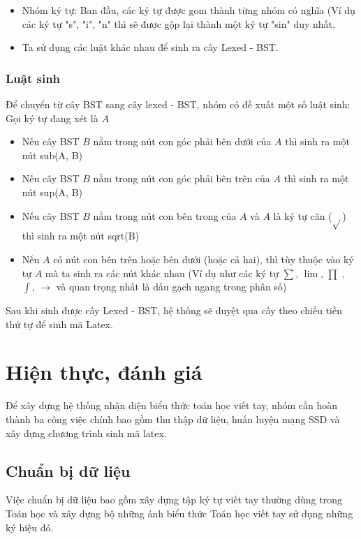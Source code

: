 \documentclass[a4paper,12pt]{article}
\begin{document}
	\begin{itemize}
		\item Nhóm ký tự: Ban đầu, các ký tự được gom thành từng nhóm có nghĩa (Ví dụ các ký tự "s", "i", "n" thì sẽ được gộp lại thành một ký tự "sin" duy nhất.
		\item Ta sử dụng các luật khác nhau để sinh ra cây Lexed - BST\cite{zanibbi}.
	\end{itemize}
	
	\subsubsection*{Luật sinh}
	
	
	Để chuyển từ cây BST\cite{zanibbi} sang cây lexed - BST\cite{zanibbi}, nhóm có đề xuất một số luật sinh: \\
	Gọi ký tự đang xét là $A$
	\begin{itemize}
		\item Nếu cây BST $B$ nằm trong nút con góc phải bên dưới của $A$ thì sinh ra một nút sub(A, B)
		\item Nếu cây BST $B$ nằm trong nút con góc phải bên trên của $A$ thì sinh ra một nút sup(A, B)
		\item Nếu cây BST $B$ nằm trong nút con bên trong của $A$ và $A$ là ký tự căn ($\sqrt{}$) thì sinh ra một nút sqrt(B)
		\item Nếu $A$ có nút con bên trên hoặc bên dưới (hoặc cả hai), thì tùy thuộc vào ký tự $A$ mà ta sinh ra các nút khác nhau (Ví dụ như các ký tự $\sum$, $\lim$, $\prod$ , $\int$, $\rightarrow$ và quan trọng nhất là dấu gạch ngang trong phân số)
		
	\end{itemize}
	
	Sau khi sinh được cây Lexed - BST\cite{zanibbi}, hệ thống sẽ duyệt qua cây theo chiều tiền thứ tự để sinh mã Latex.
	
	\newpage
	\section{Hiện thực, đánh giá}
	
	Để xây dựng hệ thống nhận diện biểu thức toán học viết tay, nhóm cần hoàn thành ba công việc chính bao gồm thu thập dữ liệu, huấn luyện mạng SSD và xây dựng chương trình sinh mã latex.
	
	\subsection{Chuẩn bị dữ liệu}
	Việc chuẩn bị dữ liệu bao gồm xây dựng tập ký tự viết tay thường dùng trong Toán học và xây dựng bộ những ảnh biểu thức Toán học viết tay sử dụng những ký hiệu đó.
\end{document}
